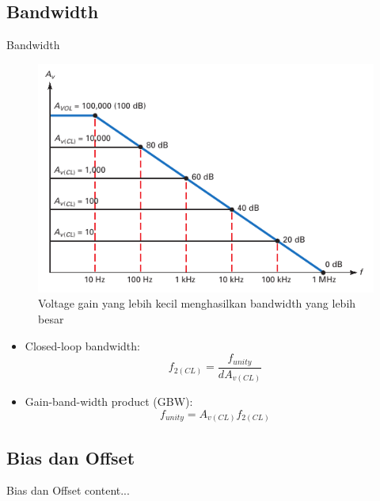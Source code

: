\subsection{Bandwidth}
\begin{frame}{Bandwidth}
	\begin{multicols}{2}
		\begin{figure}
			\centering
			\includegraphics[height=0.6\textheight]{gambar/fig-16.15}
			\caption{Voltage gain yang lebih kecil menghasilkan bandwidth yang lebih besar}
			\label{fig-16.15}
		\end{figure}
	\columnbreak
		\begin{itemize}
			\item Closed-loop bandwidth:
			\begin{equation}\label{pers.16.5}
				f_{2(CL)} = \frac{f_{unity}}{dA_{v(CL)}}
			\end{equation}
			\item Gain-band-width product (GBW):
			\begin{equation}\label{pers.16.6}
				f_{unity} = A_{v(CL)}f_{2(CL)}
			\end{equation}
		\end{itemize}
	\end{multicols}
\end{frame}

\subsection{Bias dan Offset}
\begin{frame}{Bias dan Offset}
	content...
\end{frame}